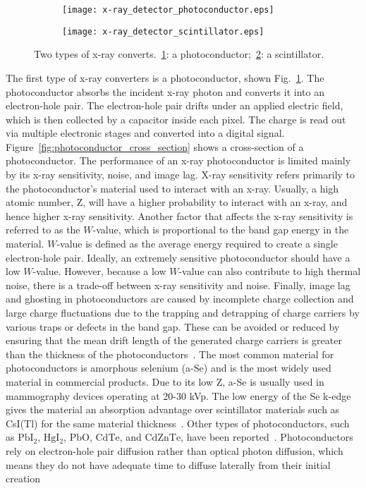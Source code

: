 \begin{figure}[ht]
\centering
	\begin{subfigure}[h]{0.3\linewidth}
		\texttt{[image: x-ray\_detector\_photoconductor.eps]}
		\caption{}
		\label{fig:xray_photoconductor}
	\end{subfigure}
	\hspace{2 cm}
	\begin{subfigure}[h]{0.3\linewidth}
		\texttt{[image: x-ray\_detector\_scintillator.eps]}
		\caption{}
		\label{fig:xray_scintillator}
	\end{subfigure}
	\caption{Two types of x-ray converts.~\ref{fig:xray_photoconductor}: a photoconductor;~\ref{fig:xray_scintillator}: a scintillator.}
	\label{fig:x-ray_detector}
\end{figure}

The first type of x-ray converters is a photoconductor, shown Fig.~\ref{fig:xray_photoconductor}.  The photoconductor absorbs the incident x-ray photon and converts it into an electron-hole pair.  The electron-hole pair drifts under an applied electric field, which is then collected by a capacitor inside each pixel.  The charge is read out via multiple electronic stages and converted into a digital signal.  Figure~\ref{fig:photoconductor_cross_section} shows a cross-section of a photoconductor.  The performance of an x-ray photoconductor is limited mainly by its x-ray sensitivity, noise, and image lag.  X-ray sensitivity refers primarily to the photoconductor's material used to interact with an x-ray.  Usually, a high atomic number, Z, will have a higher probability to interact with an x-ray, and hence higher x-ray sensitivity.  Another factor that affects the x-ray sensitivity is referred to as the $W$-value, which is proportional to the band gap energy in the material.  $W$-value is defined as the average energy required to create a single electron-hole pair.  Ideally, an extremely sensitive photoconductor should have a low $W$-value.  However, because a low $W$-value can also contribute to high thermal noise, there is a trade-off between x-ray sensitivity and noise.  Finally, image lag and ghosting in photoconductors are caused by incomplete charge collection and large charge fluctuations due to the trapping and detrapping of charge carriers by various traps or defects in the band gap.  These can be avoided or reduced by ensuring that the mean drift length of the generated charge carriers is greater than the thickness of the photoconductors~\citep{Kim2008, kasap2006}.  The most common material for photoconductors is amorphous selenium (a-Se) and is the most widely used material in commercial products.  Due to its low Z, a-Se is usually used in mammography devices operating at 20-30 kVp.  The low energy of the Se k-edge gives the material an absorption advantage over scintillator materials such as CsI(Tl) for the same material thickness~\citep{Yorkston2007}.  Other types of photoconductors, such as $\mathrm{PbI_2}$, $\mathrm{HgI_2}$, $\mathrm{PbO}$, $\mathrm{CdTe}$, and $\mathrm{CdZnTe}$, have been reported~\citep{springer2007}.  Photoconductors rely on electron-hole pair diffusion rather than optical photon diffusion, which means they do not have adequate time to diffuse laterally from their initial creation 